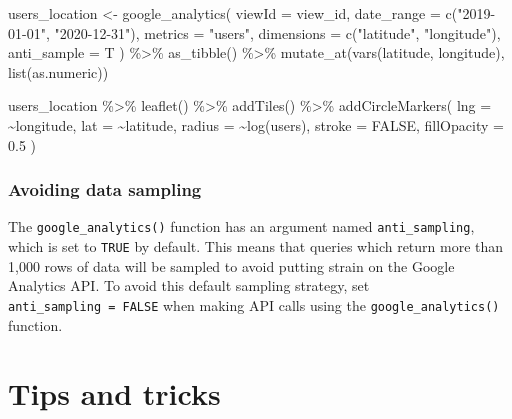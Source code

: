 \documentclass[
]{book}
\newenvironment{Shaded}{\begin{snugshade}}{\end{snugshade}}
\newcommand{\AttributeTok}[1]{\textcolor[rgb]{0.77,0.63,0.00}{#1}}
\newcommand{\ConstantTok}[1]{\textcolor[rgb]{0.00,0.00,0.00}{#1}}
\newcommand{\FloatTok}[1]{\textcolor[rgb]{0.00,0.00,0.81}{#1}}
\newcommand{\FunctionTok}[1]{\textcolor[rgb]{0.00,0.00,0.00}{#1}}
\newcommand{\NormalTok}[1]{#1}
\newcommand{\OtherTok}[1]{\textcolor[rgb]{0.56,0.35,0.01}{#1}}
\newcommand{\SpecialCharTok}[1]{\textcolor[rgb]{0.00,0.00,0.00}{#1}}
\newcommand{\StringTok}[1]{\textcolor[rgb]{0.31,0.60,0.02}{#1}}
\begin{document}
\begin{Shaded}
\begin{Highlighting}[]
\NormalTok{users\_location }\OtherTok{\textless{}{-}} \FunctionTok{google\_analytics}\NormalTok{(}
  \AttributeTok{viewId =}\NormalTok{ view\_id,}
  \AttributeTok{date\_range =} \FunctionTok{c}\NormalTok{(}\StringTok{"2019{-}01{-}01"}\NormalTok{, }\StringTok{"2020{-}12{-}31"}\NormalTok{),}
  \AttributeTok{metrics =} \StringTok{"users"}\NormalTok{,}
  \AttributeTok{dimensions =} \FunctionTok{c}\NormalTok{(}\StringTok{"latitude"}\NormalTok{, }\StringTok{"longitude"}\NormalTok{),}
  \AttributeTok{anti\_sample =}\NormalTok{ T}
\NormalTok{) }\SpecialCharTok{\%\textgreater{}\%}
  \FunctionTok{as\_tibble}\NormalTok{() }\SpecialCharTok{\%\textgreater{}\%}
  \FunctionTok{mutate\_at}\NormalTok{(}\FunctionTok{vars}\NormalTok{(latitude, longitude), }\FunctionTok{list}\NormalTok{(as.numeric))}

\NormalTok{users\_location }\SpecialCharTok{\%\textgreater{}\%}
  \FunctionTok{leaflet}\NormalTok{() }\SpecialCharTok{\%\textgreater{}\%} 
  \FunctionTok{addTiles}\NormalTok{() }\SpecialCharTok{\%\textgreater{}\%}
  \FunctionTok{addCircleMarkers}\NormalTok{(}
    \AttributeTok{lng =} \SpecialCharTok{\textasciitilde{}}\NormalTok{longitude,}
    \AttributeTok{lat =} \SpecialCharTok{\textasciitilde{}}\NormalTok{latitude,}
    \AttributeTok{radius =} \SpecialCharTok{\textasciitilde{}}\FunctionTok{log}\NormalTok{(users),}
    \AttributeTok{stroke =} \ConstantTok{FALSE}\NormalTok{, }
    \AttributeTok{fillOpacity =} \FloatTok{0.5}
\NormalTok{  )}
\end{Highlighting}
\end{Shaded}

\hypertarget{avoiding-data-sampling}{%
\subsection{Avoiding data sampling}\label{avoiding-data-sampling}}

The \texttt{google\_analytics()} function has an argument named \texttt{anti\_sampling}, which is set to \texttt{TRUE} by default. This means that queries which return more than 1,000 rows of data will be sampled to avoid putting strain on the Google Analytics API. To avoid this default sampling strategy, set \texttt{anti\_sampling\ =\ FALSE} when making API calls using the \texttt{google\_analytics()} function.

\hypertarget{tips-tricks}{%
\chapter{Tips and tricks}\label{tips-tricks}}
\end{document}
